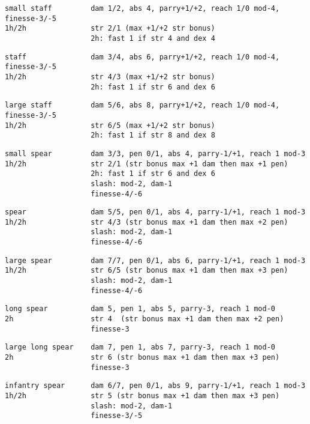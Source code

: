 \begin{samepage}
\begin{verbatim}
small staff         dam 1/2, abs 4, parry+1/+2, reach 1/0 mod-4, finesse-3/-5
1h/2h               str 2/1 (max +1/+2 str bonus)
                    2h: fast 1 if str 4 and dex 4
\end{verbatim} \blocklistgap \begin{verbatim}
staff               dam 3/4, abs 6, parry+1/+2, reach 1/0 mod-4, finesse-3/-5
1h/2h               str 4/3 (max +1/+2 str bonus)
                    2h: fast 1 if str 6 and dex 6
\end{verbatim} \blocklistgap \begin{verbatim}
large staff         dam 5/6, abs 8, parry+1/+2, reach 1/0 mod-4, finesse-3/-5
1h/2h               str 6/5 (max +1/+2 str bonus)
                    2h: fast 1 if str 8 and dex 8
\end{verbatim} \blocklistgap \begin{verbatim}
small spear         dam 3/3, pen 0/1, abs 4, parry-1/+1, reach 1 mod-3
1h/2h               str 2/1 (str bonus max +1 dam then max +1 pen)
                    2h: fast 1 if str 6 and dex 6
                    slash: mod-2, dam-1
                    finesse-4/-6
\end{verbatim} \blocklistgap \begin{verbatim}
spear               dam 5/5, pen 0/1, abs 4, parry-1/+1, reach 1 mod-3
1h/2h               str 4/3 (str bonus max +1 dam then max +2 pen)
                    slash: mod-2, dam-1
                    finesse-4/-6
\end{verbatim} \blocklistgap \begin{verbatim}
large spear         dam 7/7, pen 0/1, abs 6, parry-1/+1, reach 1 mod-3
1h/2h               str 6/5 (str bonus max +1 dam then max +3 pen)
                    slash: mod-2, dam-1
                    finesse-4/-6
\end{verbatim} \blocklistgap \begin{verbatim}
long spear          dam 5, pen 1, abs 5, parry-3, reach 1 mod-0
2h                  str 4  (str bonus max +1 dam then max +2 pen)
                    finesse-3
\end{verbatim} \blocklistgap \begin{verbatim}
large long spear    dam 7, pen 1, abs 7, parry-3, reach 1 mod-0
2h                  str 6 (str bonus max +1 dam then max +3 pen)
                    finesse-3
\end{verbatim} \blocklistgap \begin{verbatim}
infantry spear      dam 6/7, pen 0/1, abs 9, parry-1/+1, reach 1 mod-3
1h/2h               str 5 (str bonus max +1 dam then max +3 pen)
                    slash: mod-2, dam-1
                    finesse-3/-5
\end{verbatim} \end{samepage} \normalsize \goodbreak

